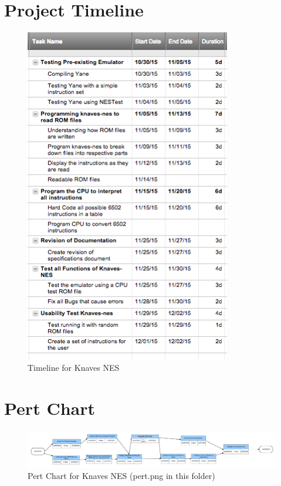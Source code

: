 \documentclass[12pt]{article}
\begin{document}
\section{Project Timeline}
	\begin{figure}[H]
		\centering
		\includegraphics[width=90mm]{timeline.png}
		\caption{Timeline for Knaves NES}
	\end{figure}

\section{Pert Chart}
	\begin{figure}[H]
		\includegraphics[width=180mm]{pert.png}
		\caption{Pert Chart for Knaves NES (pert.png in this folder)}
	\end{figure}
\end{document}
